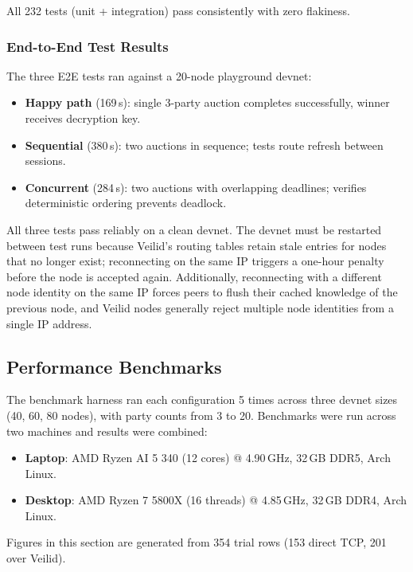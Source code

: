 All 232 tests (unit + integration) pass consistently with zero flakiness.

\subsubsection{End-to-End Test Results}

The three E2E tests ran against a 20-node playground devnet:

\begin{itemize}[noitemsep]
  \item \textbf{Happy path} (169\,s): single 3-party auction
    completes successfully, winner receives decryption key.
  \item \textbf{Sequential} (380\,s): two auctions in sequence;
    tests route refresh between sessions.
  \item \textbf{Concurrent} (284\,s): two auctions with overlapping
    deadlines; verifies deterministic ordering prevents deadlock.
\end{itemize}

All three tests pass reliably on a clean devnet.  The devnet must be
restarted between test runs because Veilid's routing tables retain stale
entries for nodes that no longer exist; reconnecting on the same IP triggers
a one-hour penalty before the node is accepted again.  Additionally,
reconnecting with a different node identity on the same IP forces peers to
flush their cached knowledge of the previous node, and Veilid nodes
generally reject multiple node identities from a single IP address.

\subsection{Performance Benchmarks}
\label{sec:results-benchmarks}

The benchmark harness ran each configuration 5 times across three devnet
sizes (40, 60, 80 nodes), with party counts from 3 to 20.  Benchmarks were
run across two machines and results were combined:

\begin{itemize}[noitemsep]
  \item \textbf{Laptop}: AMD Ryzen AI 5 340 (12 cores) @ 4.90\,GHz,
    32\,GB DDR5, Arch Linux.
  \item \textbf{Desktop}: AMD Ryzen 7 5800X (16 threads) @ 4.85\,GHz,
    32\,GB DDR4, Arch Linux.
\end{itemize}

Figures in this section are generated from 354 trial rows
(153 direct TCP, 201 over Veilid).

